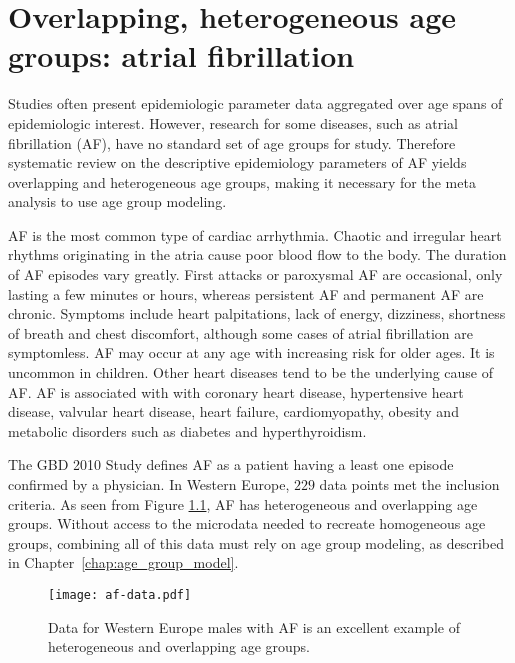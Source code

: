 \chapter{Overlapping, heterogeneous age groups: atrial fibrillation}
\label{applications-age_groups}

Studies often present epidemiologic parameter data aggregated 
over age spans of epidemiologic interest.  However, research 
for some diseases, such as atrial fibrillation (AF), have no 
standard set of age groups for study.  Therefore systematic review on
the descriptive epidemiology parameters of AF yields overlapping 
and heterogeneous age groups, making it necessary for the meta analysis
to use age group modeling.

AF is the most common type of cardiac arrhythmia.
Chaotic and irregular heart rhythms originating in the atria cause
poor blood flow to the body.  The duration of AF episodes vary greatly.
First attacks or paroxysmal AF are occasional, only lasting a few minutes 
or hours, whereas persistent AF and permanent AF are chronic. 
Symptoms include heart palpitations,
lack of energy, dizziness, shortness of breath and chest discomfort,
although some cases of atrial fibrillation are symptomless.  AF
may occur at any age with increasing risk for older ages.
It is uncommon in children.  Other heart diseases tend to be the underlying
cause of AF.  AF is associated with with coronary heart disease, 
hypertensive heart disease, valvular heart disease, heart failure, 
cardiomyopathy, obesity and metabolic disorders such as diabetes 
and hyperthyroidism. \cite{rich_epidemiology_2009,
rho_asymptomatic_2005, fuster_acc/aha/esc_2006, radford_atrial_1977, 
TK_ref_from_Mehrdad}

The GBD 2010 Study defines AF as a patient having a least one episode
confirmed by a physician.  In Western Europe, $229$ data
points met the inclusion criteria.  As seen from Figure \ref{fig:app-af data}, 
AF has heterogeneous and overlapping age groups.  Without
access to the microdata needed to recreate homogeneous age groups, combining all of this data must rely on age group modeling, as described in Chapter~\ref{chap:age_group_model}.

    \begin{figure}[h]
        \begin{center}
            \texttt{[image: af-data.pdf]}
            \caption{Data for Western Europe males with 
              AF is an excellent example of heterogeneous
              and overlapping age groups.}
            \label{fig:app-af data}
        \end{center}
    \end{figure}


